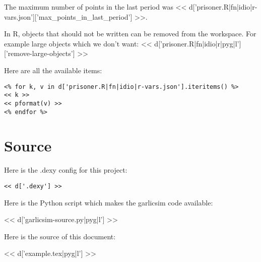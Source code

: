\documentclass[a4paper]{tufte-handout}
\begin{document}
\sffamily
The maximum number of points in the last period was
<< d['prisoner.R|fn|idio|r-vars.json']['max_points_in_last_period'] >>.
\normalfont

In R, objects that should not be written can be removed from the workspace. For
example large objects which we don't want:
<< d['prisoner.R|fn|idio|r|pyg|l']['remove-large-objects'] >>

Here are all the available items:

\begin{verbatim}
<% for k, v in d['prisoner.R|fn|idio|r-vars.json'].iteritems() %>
<< k >>
<< pformat(v) >>
<% endfor %>
\end{verbatim}

\section{Source}

Here is the .dexy config for this project:

\scriptsize
\begin{verbatim}
<< d['.dexy'] >>
\end{verbatim}
\normalsize

Here is the Python script which makes the garlicsim code available:

<< d['garlicsim-source.py|pyg|l'] >>

Here is the source of this document:

\scriptsize
<< d['example.tex|pyg|l'] >>
\end{document}
